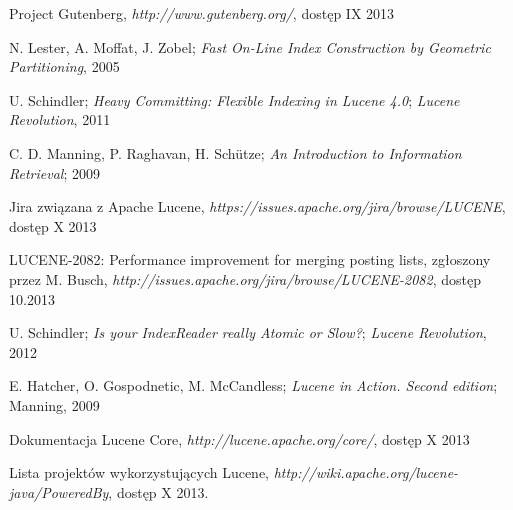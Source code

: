 \begin{thebibliography}{10}
 
  Project Gutenberg, \emph{http://www.gutenberg.org/}, dostęp IX 2013
 
  N. Lester, A. Moffat, J. Zobel; \emph{Fast On-Line Index Construction by Geometric Partitioning}, 2005
 
  U. Schindler; \emph{Heavy Committing: Flexible Indexing in Lucene 4.0}; \emph{Lucene Revolution}, 2011
 
  C. D. Manning, P. Raghavan, H. Sch\"{u}tze; \emph{An Introduction to Information Retrieval}; 2009
 
  Jira związana z Apache Lucene, \emph{https://issues.apache.org/jira/browse/LUCENE}, dostęp X 2013
 
  LUCENE-2082: Performance improvement for merging posting lists, zgłoszony przez M. Busch, \emph{http://issues.apache.org/jira/browse/LUCENE-2082}, dostęp 10.2013
 
  U. Schindler; \emph{Is your IndexReader really Atomic or Slow?}; \emph{Lucene Revolution}, 2012
 
  E. Hatcher, O. Gospodnetic, M. McCandless; \emph{Lucene in Action. Second edition}; Manning, 2009
 
  Dokumentacja Lucene Core, \emph{http://lucene.apache.org/core/}, dostęp X 2013
 
  Lista projektów wykorzystujących Lucene, \emph{http://wiki.apache.org/lucene-java/PoweredBy}, dostęp X 2013.
 
\end{thebibliography}
